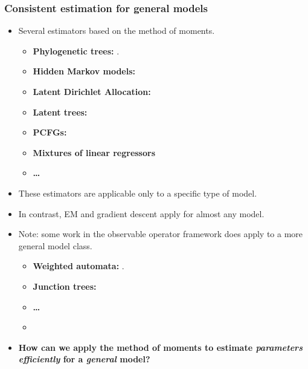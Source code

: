 \documentclass[xcolor={svgnames}]{beamer}
\begin{document}
\begin{frame}
  \frametitle{Consistent estimation for general models}

  \begin{itemize}
    \item<+-> Several estimators based on the method of moments.
      \begin{itemize}
        \item {\bf Phylogenetic trees:} \cite{mossel2005learning}.
        \item {\bf Hidden Markov models:} \cite{hsu09spectral}
        \item {\bf Latent Dirichlet Allocation:} \cite{anandkumar12lda}
        \item {\bf Latent trees:} \cite{anandkumar11tree}
        \item {\bf PCFGs:} \cite{hsu12identifiability}
        \item {\bf Mixtures of linear regressors} \cite{chaganty13regression}
        \item {\bf \ldots}
      \end{itemize}
    \item<+-> These estimators are applicable only to a specific type of model. 
    \item<+-> In contrast, EM and gradient descent apply for almost any model.
    \item<+-> Note: some work in the observable operator framework does apply to a more general model class.
      \begin{itemize}
        \item {\bf Weighted automata:} \cite{balle12automata}.
        \item {\bf Junction trees:} \cite{song2011spectral}
        \item {\bf \ldots}
        \item {}
      \end{itemize}
    \item<+-> {\bf How can we apply the method of moments to estimate {\em parameters efficiently} for a {\em general} model?}
  \end{itemize}
\end{frame}
\end{document}
